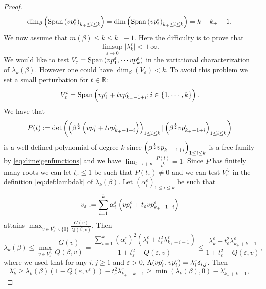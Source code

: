 \documentclass[10pt,a4paper]{amsart}
\def\ep{{\varepsilon}}
\newcommand{\R}{\mathbb{R}}
\newcommand{\vp}{{\rm vp}}
\begin{document}
\begin{proof}
\begin{equation} \label{eq:dimeigenfunctions}\dim_\beta\left(\text{Span} \left( \vp_i^\ep \right)_{k_+ \leq  i \leq k} \right) = \dim\left(\text{Span} \left( \vp_i^\ep \right)_{k_+ \leq  i \leq k} \right) = k-k_++1. \end{equation}
We now assume that $m(\beta) \leq k\leq k_+-1$. Here the difficulty is to prove that
\begin{equation} \label{eq:provelimsup} \limsup_{\ep\to 0} \vert \lambda_k^\ep \vert < + \infty. \end{equation}
We would like to test $V_\ep = \text{Span}\left(\vp_1^\ep ,\cdots \vp_k^\ep\right)$ in the variational characterization of $\lambda_k(\beta)$. However one could have $\dim_\beta \left( V_\ep\right) < k$. To avoid this problem we set a small perturbation for $t \in \R$:
$$ V_\ep^t =  \text{Span}\left(\vp_i^\ep + t \vp_{k_+ -1 +i}^\ep ; i \in \{1,\cdots,k\} \right). $$
We have that 
$$P(t) := \det\left( \left(\beta^{\frac{1}{2}} \left(\vp_i^\ep + t \vp_{k_+ -1 +i}^\ep \right) \right)_{1\leq i \leq k} \vert \left(\beta^{\frac{1}{2}}\vp_{k_+ -1 + i}^\ep\right)_{1\leq i \leq k} \right)$$
is a well defined polynomial of degree $k$ since $\left(\beta^{\frac{1}{2}}\vp_{k_+ -1 + i}\right)_{1\leq i \leq k}$ is a free family by \eqref{eq:dimeigenfunctions} and we have $\lim_{t\to +\infty} \frac{P(t)}{t^k} = 1$. Since $P$ has finitely many roots we can let $t _\ep \leq 1$ be such that $P(t_\ep)\neq 0$ and we can test $V_\ep^{t_\ep}$ in the definition  \eqref{eq:def:lambdak}  of $\lambda_k(\beta)$.  Let $(\alpha_i^{\ep})_{1 \le i \le k}$ be such that 
$$ v_{\ep}:=  \sum_{i=1}^k \alpha_i^\ep \left(\vp_i^\ep + t_\ep \vp_{k_+ -1 +i}^\ep\right)$$
attains $\max_{v \in V_\ep^{t_\ep} \backslash \{0\}} \frac{G(v)}{Q(\beta,v)} $. Then 
$$ \lambda_k(\beta) \leq \max_{v \in V_\ep^{t_\ep}} \frac{G(v)}{Q(\beta,v)} = \frac{\sum_{i=1}^k \left(\alpha_i^\ep\right)^2\left( \lambda_i^\ep + t_\ep^2 \lambda_{k_+ +i-1}^\ep \right) }{ 1 + t_\ep^2 - Q(\ep,v)} \leq  \frac{\lambda_k^\ep + t_\ep^2 \lambda_{k_+ +k-1}^\ep  }{ 1 + t_\ep^2 - Q(\ep,v)} , $$
where we used that for any $i,j\geq 1$ and $\ep >0$, $\Lambda(\vp_i^\ep,\vp_i^\ep) = \lambda_i^\ep \delta_{i,j}$. Then
$$\lambda_k^\ep \geq \lambda_k(\beta)\left( 1-Q(\ep,v^{\ep}) \right) - t_{\ep}^2 \lambda_{k_++k-1}^\ep \geq \min\left(\lambda_k(\beta),0\right) - \lambda_{k_++k-1}^\ep, $$

\end{proof}
\end{document}
